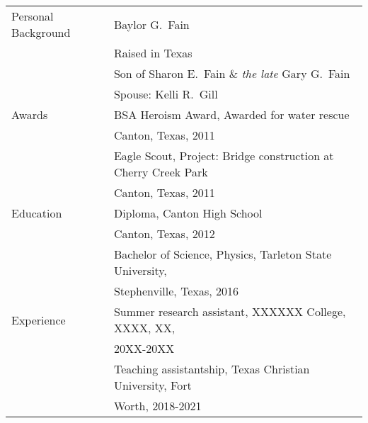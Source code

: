 \begin{tabular}{ll}
Personal Background 	 & Baylor G.\ Fain \\
						 & Raised in Texas\\
						 & Son of Sharon E.\ Fain \& \emph{the late} Gary G.\ Fain \\
    					 & Spouse: Kelli R.\ Gill \\[5mm]
Awards                   & BSA Heroism Award, Awarded for water rescue \\   & \hspace{10mm} Canton, Texas, 2011 \\
                         & Eagle Scout, Project: Bridge construction at Cherry Creek Park\\   & \hspace{10mm} Canton, Texas, 2011 \\

Education				 & Diploma, Canton High School \\  & \hspace{10mm} Canton, Texas, 2012 \\
						 & Bachelor of Science, Physics, Tarleton State University, \\  & \hspace{10mm} Stephenville, Texas, 2016 \\
Experience			     & Summer research assistant, XXXXXX College, XXXX, XX, \\	 & \hspace{10mm} 20XX-20XX \\
						 & Teaching assistantship, Texas Christian University, Fort \\ 	 & \hspace{10mm} Worth, 2018-2021 \\
\end{tabular}

